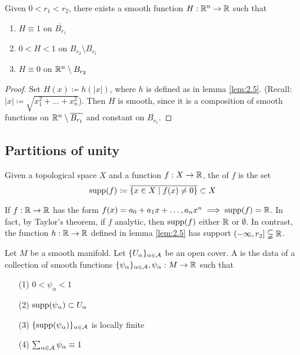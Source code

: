 \begin{lemma}\label{lem:2.6}
    Given \(0<r_1<r_2\), there exists a smooth function \(H:\mathbb{R}^n\to\mathbb{R}\) such that 
    \begin{enumerate}
        \item \(H\equiv 1\) on \(\overline{B_{r_1}}\)
        \item \(0<H<1\) on \(B_{r_2}\setminus \overline{B_{r_1}}\)
        \item \(H\equiv 0\) on \(\mathbb{R}^n\setminus B_{r_2}\)
    \end{enumerate}
\end{lemma}

\begin{proof}
    Set \(H(x)\coloneqq h(|x|)\), where \(h\) is defined as in lemma \ref{lem:2.5}. (Recall: \(|x|\coloneqq \sqrt{x_1^2+\dots+x_n^2}\)).
    Then \(H\) is smooth, since it is a composition of smooth functions on \(\mathbb{R}^n\setminus \overline{B_{r_1}}\) and constant on \(\overline{B_{r_1}}\).
\end{proof}

\subsection{Partitions of unity}

\begin{definition*}
    Given a topological space \(X\) and a function \(f:X\to\mathbb{R}\), the  of \(f\) is the set 
    \[\text{supp}(f)\coloneqq\overline{ \{x\in X\mid f(x)\neq 0\}}\subset X\]
\end{definition*}

\begin{example}
    If \(f:\mathbb{R}\to\mathbb{R}\) has the form \(f(x)=a_0+a_1x+\dots,a_nx^n\implies \text{supp}(f)=\mathbb{R}\).
    In fact, by Taylor's theorem, if \(f\) analytic, then \(\text{supp}(f)\) either \(\mathbb{R}\) or \(\emptyset\).
    In contrast, the function \(h:\mathbb{R}\to\mathbb{R}\) defined in lemma \ref{lem:2.5} has support \((-\infty,r_2]\subsetneqq\mathbb{R}\).
\end{example}

\begin{definition*}
    Let \(M\) be a smooth manifold. Let \(\{U_\alpha\}_{\alpha\in \mathcal{A}}\) be an open cover. 
    A  is the data of a collection of smooth functions \(\{\psi_\alpha\}_{\alpha\in\mathcal{A}},\psi_\alpha:M\to\mathbb{R}\)
    such that 
    \begin{enumerate}
        \item[(1)] \(0<\psi_\alpha<1\)
        \item[(2)] \(\text{supp}(\psi_\alpha)\subset U_\alpha\)
        \item[(3)] \(\{\text{supp}(\psi_\alpha)\}_{\alpha\in\mathcal{A}}\) is locally finite 
        \item[(4)] \(\sum_{\alpha\in\mathcal{A}} \psi_\alpha\equiv 1\)    
    \end{enumerate}
\end{definition*}

